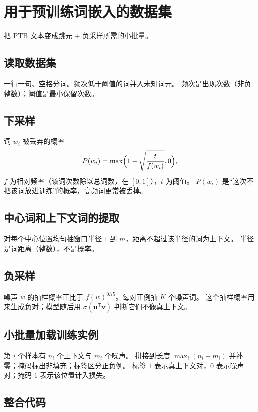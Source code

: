 \section{用于预训练词嵌入的数据集}

把 PTB 文本变成跳元 $+$ 负采样所需的小批量。

\subsection{读取数据集}

一行一句、空格分词。频次低于阈值的词并入未知词元。
频次是出现次数（非负整数）；阈值是最小保留次数。

\subsection{下采样}

词 $w_i$ 被丢弃的概率
\[
P(w_i)=\max\Bigl(1-\sqrt{\frac{t}{f(w_i)}},0\Bigr),
\]
$f$ 为相对频率（该词次数除以总词数，在 $[0,1]$），$t$ 为阈值。
$P(w_i)$ 是“这次不把该词放进训练”的概率，高频词更常被丢掉。

\subsection{中心词和上下文词的提取}

对每个中心位置均匀抽窗口半径 $1$ 到 $m$，距离不超过该半径的词为上下文。
半径是词距离（整数），不是概率。

\subsection{负采样}

噪声 $w$ 的抽样概率正比于 $f(w)^{0.75}$。每对正例抽 $K$ 个噪声词。
这个抽样概率用来生成负对；模型随后用 $\sigma(\bm{u}^{\mathsf T}\bm{v})$ 判断它们不像真上下文。

\subsection{小批量加载训练实例}

第 $i$ 个样本有 $n_i$ 个上下文与 $m_i$ 个噪声。
拼接到长度 $\max_i(n_i+m_i)$ 并补零；掩码标出非填充；标签区分正负例。
标签 $1$ 表示真上下文对，$0$ 表示噪声对；掩码 $1$ 表示该位置计入损失。

\subsection{整合代码}

